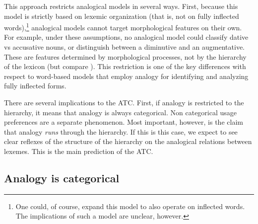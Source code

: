 This approach restricts analogical models in several ways. First, because this model is strictly based on lexemic organization (that is, not on fully inflected words),\footnote{One could, of course, expand this model to also operate on inflected words. The implications of such a model are unclear, however.} analogical models cannot target morphological features on their own. For example, under these assumptions, no analogical model could classify dative vs accusative nouns, or distinguish between a diminutive and an augmentative. These are features determined by morphological processes, not by the hierarchy of the lexicon (but compare \textcite{Koenig.1999}). This restriction is one of the key differences with respect to word-based models that employ analogy for identifying and analyzing fully inflected forms.

There are several implications to the ATC. First, if analogy is restricted to the hierarchy, it means that analogy is always categorical. Non categorical usage preferences are a separate phenomenon. Most important, however, is the claim that analogy \textit{runs} through the hierarchy. If this is this case, we expect to see clear reflexes of the structure of the hierarchy on the analogical relations between lexemes. This is the main prediction of the ATC.

\subsection{Analogy is categorical}


